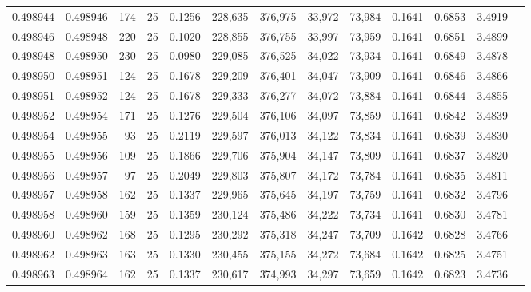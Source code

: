 \begin{tabular}{rrrrrrrrrrrrr}
0.498944 & 0.498946 & 174 &  25 &                                     0.1256 & 228,635 & 376,975 &  33,972 &  73,984 & 0.1641 & 0.6853 & 3.4919 \\
0.498946 & 0.498948 & 220 &  25 &                                     0.1020 & 228,855 & 376,755 &  33,997 &  73,959 & 0.1641 & 0.6851 & 3.4899 \\
0.498948 & 0.498950 & 230 &  25 &                                     0.0980 & 229,085 & 376,525 &  34,022 &  73,934 & 0.1641 & 0.6849 & 3.4878 \\
0.498950 & 0.498951 & 124 &  25 &                                     0.1678 & 229,209 & 376,401 &  34,047 &  73,909 & 0.1641 & 0.6846 & 3.4866 \\
0.498951 & 0.498952 & 124 &  25 &                                     0.1678 & 229,333 & 376,277 &  34,072 &  73,884 & 0.1641 & 0.6844 & 3.4855 \\
0.498952 & 0.498954 & 171 &  25 &                                     0.1276 & 229,504 & 376,106 &  34,097 &  73,859 & 0.1641 & 0.6842 & 3.4839 \\
0.498954 & 0.498955 &  93 &  25 &                                     0.2119 & 229,597 & 376,013 &  34,122 &  73,834 & 0.1641 & 0.6839 & 3.4830 \\
0.498955 & 0.498956 & 109 &  25 &                                     0.1866 & 229,706 & 375,904 &  34,147 &  73,809 & 0.1641 & 0.6837 & 3.4820 \\
0.498956 & 0.498957 &  97 &  25 &                                     0.2049 & 229,803 & 375,807 &  34,172 &  73,784 & 0.1641 & 0.6835 & 3.4811 \\
0.498957 & 0.498958 & 162 &  25 &                                     0.1337 & 229,965 & 375,645 &  34,197 &  73,759 & 0.1641 & 0.6832 & 3.4796 \\
0.498958 & 0.498960 & 159 &  25 &                                     0.1359 & 230,124 & 375,486 &  34,222 &  73,734 & 0.1641 & 0.6830 & 3.4781 \\
0.498960 & 0.498962 & 168 &  25 &                                     0.1295 & 230,292 & 375,318 &  34,247 &  73,709 & 0.1642 & 0.6828 & 3.4766 \\
0.498962 & 0.498963 & 163 &  25 &                                     0.1330 & 230,455 & 375,155 &  34,272 &  73,684 & 0.1642 & 0.6825 & 3.4751 \\
0.498963 & 0.498964 & 162 &  25 &                                     0.1337 & 230,617 & 374,993 &  34,297 &  73,659 & 0.1642 & 0.6823 & 3.4736 \\

\end{tabular}
